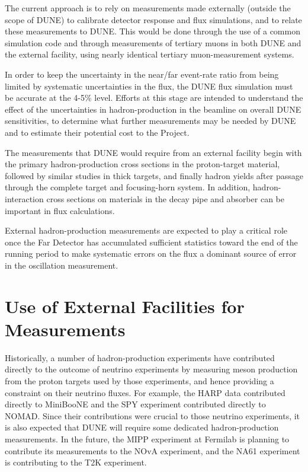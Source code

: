 The current approach is to rely on measurements made externally (outside the scope of DUNE) to calibrate detector response and flux simulations, and to relate 
these measurements to DUNE. This would be done through the use of a common simulation code and through measurements of tertiary muons in both DUNE and the external facility, using nearly identical tertiary muon-measurement systems. 

In order to keep the uncertainty in the near/far event-rate ratio from being
limited by systematic uncertainties in the flux, the DUNE flux simulation 
 must be accurate at the 4-5\% level.
Efforts at this stage are intended to understand the effect of the uncertainties in hadron-production in the beamline on overall DUNE
sensitivities, to determine what further measurements may be needed
by DUNE and to estimate their potential cost to the Project.

The measurements that DUNE would require from an external facility begin with the primary hadron-production cross
sections in the proton-target material, followed by similar studies in
thick targets, and finally hadron yields after passage through the complete target and
focusing-horn system. In addition, hadron-interaction cross sections
on materials in the decay pipe and absorber can be important in
flux calculations.

External hadron-production measurements are expected to play
a critical role once the Far Detector has accumulated sufficient
statistics toward the end of the running period to make systematic errors
on the flux a dominant source of error in the oscillation measurement. 

\section{Use of External Facilities for Measurements}

Historically, a number of hadron-production experiments have
contributed directly to the outcome of neutrino experiments
by measuring meson production from the proton targets used
by those experiments, and hence providing a constraint on their neutrino fluxes. 
For example, the HARP data\cite{ref:HARP} contributed directly to
MiniBooNE and the SPY\cite{ref:SPY} experiment contributed directly to
NOMAD. Since their contributions were crucial to those neutrino experiments, 
it is also expected that DUNE will require some dedicated hadron-production measurements.
In the future, the MIPP experiment at Fermilab is planning to contribute its
measurements to the NOvA experiment, and the NA61
experiment\cite{Abgrall:2011ae} is contributing to the T2K
experiment.


